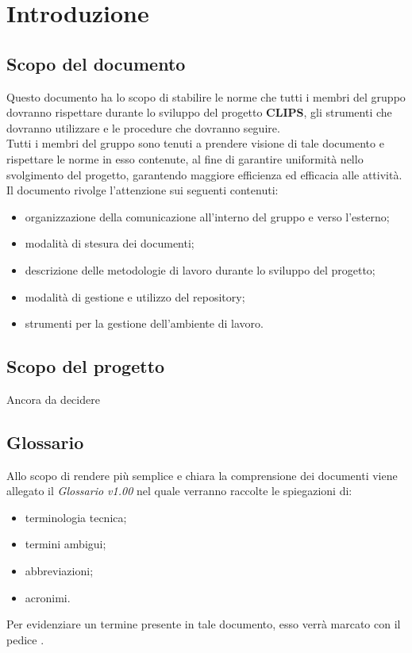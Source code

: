 \documentclass[../NormeProgetto.tex]{subfiles}
\begin{document}
\section{Introduzione}
	\subsection{Scopo del documento}
	Questo documento ha lo scopo di stabilire le norme che tutti i membri del gruppo \leaf dovranno rispettare durante lo sviluppo del progetto \textbf{CLIPS}, gli strumenti che dovranno utilizzare e le procedure che dovranno seguire. \\
	Tutti i membri del gruppo sono tenuti a prendere visione di tale documento e rispettare le norme in esso contenute, al fine di garantire uniformità nello svolgimento del progetto, garantendo maggiore efficienza ed efficacia alle attività. \\
	Il documento rivolge l'attenzione sui seguenti contenuti:
	\begin{itemize}
	\item organizzazione della comunicazione all'interno del gruppo e verso l'esterno;
	\item modalità di stesura dei documenti;
	\item descrizione delle metodologie di lavoro durante lo sviluppo del progetto;
	\item modalità di gestione e utilizzo del repository\g;
	\item strumenti per la gestione dell'ambiente di lavoro.
	\end{itemize}

	\subsection{Scopo del progetto}
	Ancora da decidere
	
	\subsection{Glossario} \label{sec:Glossario}
	Allo scopo di rendere più semplice e chiara la comprensione dei documenti viene allegato il \textit{Glossario v1.00} nel quale verranno raccolte le spiegazioni di:
	\begin{itemize}
	\item terminologia tecnica;
	\item termini ambigui;
	\item abbreviazioni;
	\item acronimi.
	\end{itemize}
	Per evidenziare un termine presente in tale documento, esso verrà marcato con il pedice \g.
	
\end{document}
